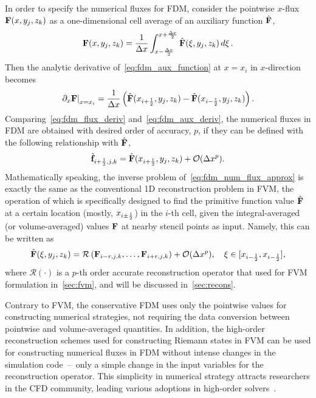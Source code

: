 In order to specify the numerical fluxes for FDM, consider the pointwise \( x \)-flux \( \mathbf{F} (x, y_{j}, z_{k}) \)
as a one-dimensional cell average of an auxiliary function \( \hat{\mathbf{F}} \),
\begin{equation}\label{eq:fdm_aux_function}
    \mathbf{F}(x,y_j,z_k) = \frac{1}{\Delta x} \int_{x - \frac{\Delta x}{2}}^{x + \frac{\Delta x}{2}} \hat{\mathbf{F}}(\xi, y_j, z_k) \mathop{d\xi}.
\end{equation}
Then the analytic derivative of~\cref{eq:fdm_aux_function} at \( x = x_{i} \) in \( x \)-direction becomes
\begin{equation}\label{eq:fdm_aux_deriv}
    \left. \partial_{x} \mathbf{F} \right|_{x=x_{i}} =
    \frac{1}{\Delta x} \left(\hat{\mathbf{F}}(x_{{i+\frac{1}{2}}}, y_j, z_k) - \hat{\mathbf{F}}(x_{{i-\frac{1}{2}}}, y_j, z_k) \right).
\end{equation}
Comparing~\cref{eq:fdm_flux_deriv} and~\cref{eq:fdm_aux_deriv},
the numerical fluxes in FDM are obtained with desired order of accuracy, \( p \),
if they can be defined with
the following relationship with $\hat{\mathbf{F}}$,
\begin{equation}\label{eq:fdm_num_flux_approx}
    \hat{\mathbf{f}}_{{i+\frac{1}{2}},j,k} = \hat{\mathbf{F}} (x_{{i+\frac{1}{2}}},y_j,z_k) + \mathcal{O} (\Delta x^{p}).
\end{equation}
Mathematically speaking, the inverse problem of~\cref{eq:fdm_num_flux_approx} is exactly the same as
the conventional 1D reconstruction problem in FVM, the operation of which is specifically designed to
find the primitive function value $\hat{\mathbf{F}}$ at a certain location (mostly, $x_{i \pm \frac{1}{2}}$) in the $i$-th cell,
given the integral-averaged (or volume-averaged) values ${\mathbf{F}}$ at nearby stencil points
as input. Namely, this can be written as
\begin{equation}\label{eq:fdm_recon}
    \hat{\mathbf{F}}(\xi,y_j,z_k) = \mathcal{R}\left(\mathbf{F}_{i-r,j,k}, \dots, \mathbf{F}_{i+r,j,k}\right) + \mathcal{O} (\Delta x^p),
    \quad
    \xi \in [x_{{i-\frac{1}{2}}}, x_{{i-\frac{1}{2}}}],
\end{equation}
where \( \mathcal{R}(\cdot) \) is a $p$-th order accurate reconstruction operator
that used for FVM formulation in~\cref{sec:fvm}, and will be discussed in~\cref{sec:recons}.

Contrary to FVM, the conservative FDM uses only the pointwise values for constructing numerical strategies,
not requiring the data conversion between pointwise and volume-averaged quantities.
In addition, the high-order reconstruction schemes used for constructing Riemann states in FVM
can be used for constructing numerical fluxes in FDM
without intense changes in the simulation code~--~only a simple change in the input variables for the reconstruction operator.
This simplicity in numerical strategy attracts researchers in the CFD community, leading various adoptions in
high-order solvers~\cite{jiang1996efficient,shu1998essentially,mignone2010high,christlieb2015picard,seal2016explicit}.

